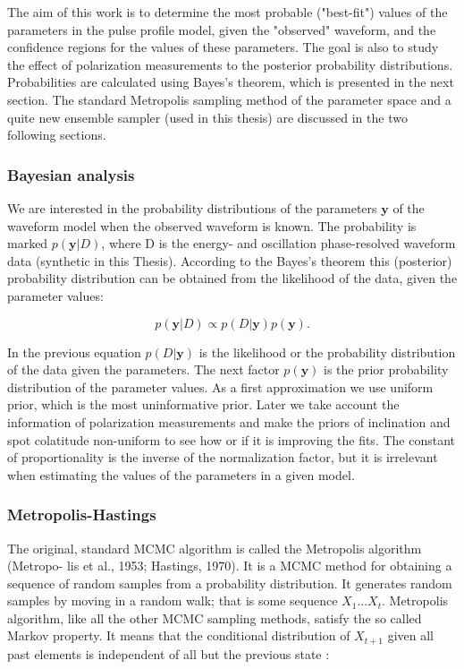 \documentclass{wihuri}
\def\be{\begin{equation}}
\def\ee{\end{equation}}
\begin{document}
The aim of this work is to determine the most probable ("best-fit") values of the parameters in the pulse profile model, given the "observed" waveform, and the confidence regions for the values of these parameters. The goal is also to study the effect of polarization measurements to the posterior probability distributions. Probabilities are calculated using Bayes's theorem, which is presented in the next section. The standard Metropolis sampling method of the parameter space and a quite new ensemble sampler (used in this thesis) are discussed in the two following sections. 

\subsubsection{Bayesian analysis}

We are interested in the probability distributions of the parameters $\textbf{y}$ of the waveform model when the observed waveform is known. The probability is marked $p(\textbf{y}|D)$, where D is the energy- and oscillation phase-resolved waveform data (synthetic in this Thesis). According to the Bayes's theorem this (posterior) probability distribution can be obtained from the likelihood of the data, given the parameter values:


\be \label{eq:bayes}
p(\textbf{y}|D) \propto p(D|\textbf{y})p(\textbf{y}).
\ee

In the previous equation $p(D|\textbf{y})$ is the likelihood or the probability distribution of the data given the parameters. The next factor $p(\textbf{y})$ is the prior probability distribution of the parameter values. As a first approximation we use uniform prior, which is the most uninformative prior. Later we take account the information of polarization measurements and make the priors of inclination and spot colatitude non-uniform to see how or if it is improving the fits. The constant of proportionality is the inverse of the normalization factor, but it is irrelevant when estimating the values of the parameters in a given model. 


\subsubsection{Metropolis-Hastings}

The original, standard MCMC algorithm is called the Metropolis algorithm (Metropo-
lis et al., 1953; Hastings, 1970). It is a MCMC method for obtaining a sequence of random samples from a probability distribution. It generates random samples by moving in a random walk; that is some sequence $X_{1}...X_{t}$. Metropolis algorithm, like all the other MCMC sampling methods, satisfy the so called Markov property. It means that the conditional distribution of $X_{t+1}$ given all past elements is independent of all but the previous state \cite{kaiser}:
\end{document}
